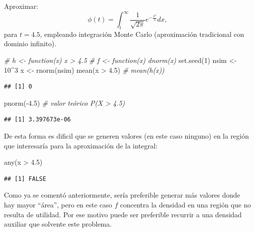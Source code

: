 \documentclass[
]{book}
\newenvironment{Shaded}{\begin{snugshade}}{\end{snugshade}}
\newcommand{\CommentTok}[1]{\textcolor[rgb]{0.56,0.35,0.01}{\textit{#1}}}
\newcommand{\DecValTok}[1]{\textcolor[rgb]{0.00,0.00,0.81}{#1}}
\newcommand{\FloatTok}[1]{\textcolor[rgb]{0.00,0.00,0.81}{#1}}
\newcommand{\FunctionTok}[1]{\textcolor[rgb]{0.00,0.00,0.00}{#1}}
\newcommand{\NormalTok}[1]{#1}
\newcommand{\OtherTok}[1]{\textcolor[rgb]{0.56,0.35,0.01}{#1}}
\newcommand{\SpecialCharTok}[1]{\textcolor[rgb]{0.00,0.00,0.00}{#1}}
\theoremstyle{break}
\theoremstyle{definition}
\theoremstyle{definition}
\theoremstyle{definition}
\theoremstyle{definition}
\theoremstyle{remark}
\begin{document}
Aproximar:
\[\phi(t)=\int_{t}^{\infty}\frac1{\sqrt{2\pi}}e^{-\frac{x^2}2}dx,\]
para \(t=4.5\), empleando integración Monte Carlo (aproximación tradicional con dominio infinito).

\begin{Shaded}
\begin{Highlighting}[]
\CommentTok{\# h \textless{}{-} function(x) x \textgreater{} 4.5}
\CommentTok{\# f \textless{}{-} function(x) dnorm(x)}
\FunctionTok{set.seed}\NormalTok{(}\DecValTok{1}\NormalTok{)}
\NormalTok{nsim }\OtherTok{\textless{}{-}} \DecValTok{10}\SpecialCharTok{\^{}}\DecValTok{3}
\NormalTok{x }\OtherTok{\textless{}{-}} \FunctionTok{rnorm}\NormalTok{(nsim)}
\FunctionTok{mean}\NormalTok{(x }\SpecialCharTok{\textgreater{}} \FloatTok{4.5}\NormalTok{) }\CommentTok{\# mean(h(x))}
\end{Highlighting}
\end{Shaded}

\begin{verbatim}
## [1] 0
\end{verbatim}

\begin{Shaded}
\begin{Highlighting}[]
\FunctionTok{pnorm}\NormalTok{(}\SpecialCharTok{{-}}\FloatTok{4.5}\NormalTok{)  }\CommentTok{\# valor teórico P(X \textgreater{} 4.5) }
\end{Highlighting}
\end{Shaded}

\begin{verbatim}
## [1] 3.397673e-06
\end{verbatim}

De esta forma es dificil que se generen valores (en este caso ninguno)
en la región que interesaría para la aproximación de la integral:

\begin{Shaded}
\begin{Highlighting}[]
\FunctionTok{any}\NormalTok{(x }\SpecialCharTok{\textgreater{}} \FloatTok{4.5}\NormalTok{)}
\end{Highlighting}
\end{Shaded}

\begin{verbatim}
## [1] FALSE
\end{verbatim}

Como ya se comentó anteriormente, sería preferible generar más valores donde hay mayor ``área'',
pero en este caso \(f\) concentra la densidad en una región que no resulta de utilidad.
Por ese motivo puede ser preferible recurrir a una densidad auxiliar que solvente este problema.
\end{document}
